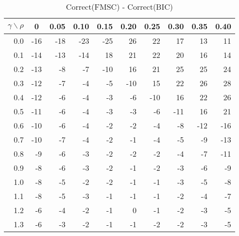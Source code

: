 \documentclass[12pt]{article}
\begin{document}
%
\begin{table}[!tbp]
\caption{Correct(FMSC) - Correct(BIC)}
 \begin{center}
 \begin{tabular}{r|rrrrrrrrr}\hline\hline
\multicolumn{1}{c|}{$\gamma\backslash\rho$}&\multicolumn{1}{c}{0}&\multicolumn{1}{c}{0.05}&\multicolumn{1}{c}{0.10}&\multicolumn{1}{c}{0.15}&\multicolumn{1}{c}{0.20}&\multicolumn{1}{c}{0.25}&\multicolumn{1}{c}{0.30}&\multicolumn{1}{c}{0.35}&\multicolumn{1}{c}{0.40}\tabularnewline
\hline



0.0&-16&-18&-23&-25& 26& 22& 17& 13& 11\tabularnewline
0.1&-14&-13&-14& 18& 21& 22& 20& 16& 14\tabularnewline
0.2&-13& -8& -7&-10& 16& 21& 25& 25& 24\tabularnewline
0.3&-12& -7& -4& -5&-10& 15& 22& 26& 28\tabularnewline
0.4&-12& -6& -4& -3& -6&-10& 16& 22& 26\tabularnewline
0.5&-11& -6& -4& -3& -3& -6&-11& 16& 21\tabularnewline
0.6&-10& -6& -4& -2& -2& -4& -8&-12&-16\tabularnewline
0.7&-10& -7& -4& -2& -1& -4& -5& -9&-13\tabularnewline
0.8& -9& -6& -3& -2& -2& -2& -4& -7&-11\tabularnewline
0.9& -8& -6& -3& -2& -1& -2& -3& -6& -9\tabularnewline
1.0& -8& -5& -2& -2& -1& -1& -3& -5& -8\tabularnewline
1.1& -8& -5& -3& -1& -1& -1& -2& -4& -7\tabularnewline
1.2& -6& -4& -2& -1&  0& -1& -2& -3& -5\tabularnewline
1.3& -6& -3& -2& -1& -1& -2& -2& -3& -5\tabularnewline
\hline
\end{tabular}

\end{center}

\end{table}
\end{document}
